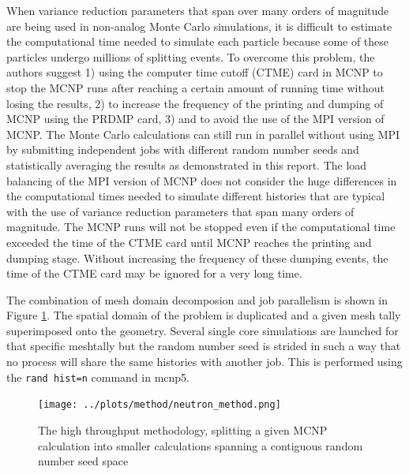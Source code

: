 \documentclass[12pt]{article}
\begin{document}

When variance reduction parameters that span over
 many orders of magnitude are being used in non-analog Monte Carlo simulations,
 it is difficult to estimate the computational time needed to simulate each 
particle because some of these particles undergo millions of splitting events. 
To overcome this problem, the authors suggest 1) using the computer time cutoff
 (CTME) card in MCNP to stop the MCNP runs after reaching a certain amount of 
running time without losing the results, 2) to increase the frequency of the 
printing and dumping of MCNP using the PRDMP card, 3) and to avoid the use of 
the MPI version of MCNP. The Monte Carlo calculations can still run in parallel
 without using MPI by submitting independent jobs with different random number 
seeds and statistically averaging the results as demonstrated in this report. 
The load balancing of the MPI  version of MCNP does not consider the huge 
differences in the computational times needed to simulate different histories
 that are typical with the use of variance reduction parameters that span many 
orders of magnitude. The MCNP runs will not be stopped even if the computational
 time exceeded the time of the  CTME card until MCNP reaches the printing and 
dumping stage. Without increasing the frequency of these dumping events, the 
time of the CTME card may be ignored for a very long time.

The combination of mesh domain decomposion and job parallelism is shown in
Figure \ref{fig:mesh_splitting}.  
The spatial domain of the problem is duplicated and a given
mesh tally superimposed onto the geometry. Several single core simulations are
launched for that specific meshtally but the random number seed is strided in
such a way that no process will share the same histories with another job.  
This is performed using the \texttt{rand hist=n} command in \gls{mcnp5}.

\begin{figure}[ht!]
  \centering
  \texttt{[image: ../plots/method/neutron\_method.png]}
  \caption{The high throughput methodology, splitting a given MCNP calculation
           into smaller calculations spanning a contiguous random number seed
           space}
  \label{fig:mesh_splitting}
\end{figure}
\end{document}
